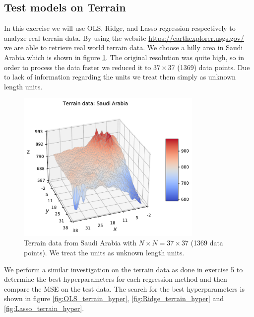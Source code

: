 \documentclass[norsk,a4paper,12pt]{scrartcl}
\begin{document}
\subsection{Test models on Terrain}
In this exercise we will use OLS, Ridge, and Lasso regression respectively to analyze real terrain data. By using the website \url{https://earthexplorer.usgs.gov/} we are able to retrieve real world terrain data. We choose a hilly area in Saudi Arabia which is shown in figure \ref{fig:terrain_data}. The original resolution was quite high, so in order to process the data faster we reduced it to $37 \times 37$ (1369) data points. Due to lack of information regarding the units we treat them simply as unknown length units.
\\
\begin{figure}[H]
    \centering
    \includegraphics[width=0.8\textwidth]{figures/terrain_data.pdf}
    \caption{Terrain data from Saudi Arabia with $N \times N = 37 \times 37$ (1369 data points). We treat the units as unknown length units.}
    \label{fig:terrain_data}
\end{figure}
We perform a similar investigation on the terrain data as done in exercise 5 to determine the best hyperparameters for each regression method and then compare the MSE on the test data. The search for the best hyperparameters is shown in figure \ref{fig:OLS_terrain_hyper}, \ref{fig:Ridge_terrain_hyper} and \ref{fig:Lasso_terrain_hyper}.
\end{document}
